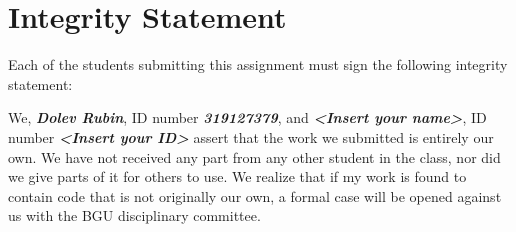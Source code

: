 \documentclass[a4paper]{article}
\theoremstyle{remarksStyle}
\theoremstyle{questionStyle}
\theoremstyle{answerStyle}
\begin{document}
\newpage
\section{Integrity Statement}
Each of the students submitting this assignment must sign the following integrity statement:

\vspace{5ex}
\begin{boxxed}
\textcolor{CB_blue}{
We, \textbf{\textit{Dolev Rubin}}, ID number \textbf{\textit{319127379}}, and \textbf{\textit{<Insert your name>}}, ID number \textbf{\textit{<Insert your ID>}} assert that the work we submitted is entirely our own.
We have not received any part from any other student in the class, nor did we give parts of it for others to use.
We realize that if my work is found to contain code that is not originally our own, a formal case will be opened against us with the BGU disciplinary committee.
}
\end{boxxed}

\vspace{1cm}

\end{document}

